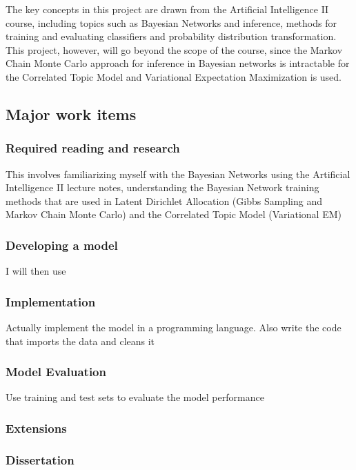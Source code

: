\documentclass[12pt,a4]{article}
\begin{document}
The key concepts in this project are drawn from the Artificial Intelligence II course, including topics such as Bayesian Networks and inference, methods for training and evaluating classifiers and probability distribution transformation. This project, however, will go beyond the scope of the course, since the Markov Chain Monte Carlo approach for inference in Bayesian networks is intractable for the Correlated Topic Model and Variational Expectation Maximization is used.

\subsection*{Major work items}

\subsubsection*{Required reading and research}
This involves familiarizing myself with the Bayesian Networks using the Artificial Intelligence II lecture notes, understanding the Bayesian Network training methods that are used in Latent Dirichlet Allocation (Gibbs Sampling and Markov Chain Monte Carlo) and the Correlated Topic Model (Variational EM)

\subsubsection*{Developing a model}
I will then use 

\subsubsection*{Implementation}
Actually implement the model in a programming language. Also write the code that imports the data and cleans it

\subsubsection*{Model Evaluation}
Use training and test sets to evaluate the model performance

\subsubsection*{Extensions}

\subsubsection*{Dissertation}
\end{document}
